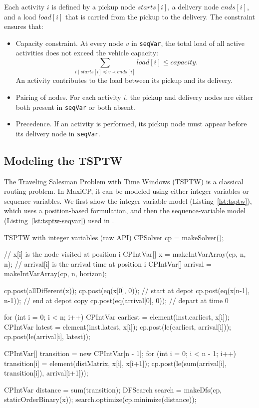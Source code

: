 \documentclass[11pt, a4paper]{scrartcl}
\newcommand{\maxicp}{\textsf{MaxiCP}}
\begin{document}
Each activity $i$ is defined by a pickup node $\textit{starts}[i]$,
a delivery node $\textit{ends}[i]$,
and a load $\textit{load}[i]$ that is carried from the pickup to the delivery.
The constraint ensures that:
\begin{itemize}
    \item Capacity constraint. At every node $v$ in \texttt{seqVar}, the total load of all active activities does not exceed the vehicle capacity:
$$
\sum_{i \mid \textit{starts}[i] \preceq v \prec \textit{ends}[i]} \textit{load}[i] \le \textit{capacity}.
$$
An activity contributes to the load between its pickup and its delivery.
\item Pairing of nodes. For each activity $i$, the pickup and delivery nodes are either both present in \texttt{seqVar} or both absent.
\item Precedence. If an activity is performed, its pickup node must appear before its delivery node in \texttt{seqVar}.
\end{itemize}

\subsection{Modeling the TSPTW}

The Traveling Salesman Problem with Time Windows (TSPTW)
is a classical routing problem.
In \maxicp, it can be modeled using either integer variables or
sequence variables.
We first show the integer-variable model (Listing~\ref{lst:tsptw}),
which uses a position-based formulation,
and then the sequence-variable model (Listing~\ref{lst:tsptw-seqvar}) used in \cite{delecluse2022sequence}.

\begin{codebox}[label={lst:tsptw}]{TSPTW with integer variables (raw API)}
CPSolver cp = makeSolver();

// x[i] is the node visited at position i
CPIntVar[] x = makeIntVarArray(cp, n, n);
// arrival[i] is the arrival time at position i
CPIntVar[] arrival = makeIntVarArray(cp, n, horizon);

cp.post(allDifferent(x));
cp.post(eq(x[0], 0));         // start at depot
cp.post(eq(x[n-1], n-1));     // end at depot copy
cp.post(eq(arrival[0], 0));   // depart at time 0

for (int i = 0; i < n; i++) {
    CPIntVar earliest = element(inst.earliest, x[i]);
    CPIntVar latest = element(inst.latest, x[i]);
    cp.post(le(earliest, arrival[i]));
    cp.post(le(arrival[i], latest));
}

CPIntVar[] transition = new CPIntVar[n - 1];
for (int i = 0; i < n - 1; i++) {
    transition[i] = element(distMatrix, x[i], x[i+1]);
    cp.post(le(sum(arrival[i], transition[i]),
               arrival[i+1]));
}

CPIntVar distance = sum(transition);
DFSearch search = makeDfs(cp, staticOrderBinary(x));
search.optimize(cp.minimize(distance));
\end{codebox}
\end{document}
